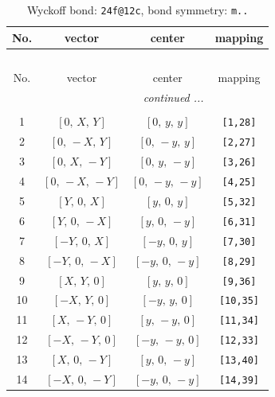 \documentclass[fleqn,8pt]{jsarticle}
\begin{document}
\begin{longtable}{cccc}
\caption{Wyckoff bond: {\tt 24f@12c}, bond symmetry: {\tt m..}}
 \\
 \hline \hline
No. & vector & center & mapping \\ \hline \endfirsthead

\multicolumn{3}{l}{\tablename\ \thetable{}} \\
 \hline \hline
No. & vector & center & mapping \\ \hline \endhead

 \hline \hline
\multicolumn{3}{r}{\footnotesize\it continued ...} \\ \endfoot

 \hline \hline
\multicolumn{3}{r}{} \\ \endlastfoot

1 & $\left[ 0,\, X,\, Y \right]$ & $\left[ 0,\, y,\, y \right]$ & {\tt [1,28]} \\ \hline
2 & $\left[ 0,\, - X,\, Y \right]$ & $\left[ 0,\, - y,\, y \right]$ & {\tt [2,27]} \\ \hline
3 & $\left[ 0,\, X,\, - Y \right]$ & $\left[ 0,\, y,\, - y \right]$ & {\tt [3,26]} \\ \hline
4 & $\left[ 0,\, - X,\, - Y \right]$ & $\left[ 0,\, - y,\, - y \right]$ & {\tt [4,25]} \\ \hline
5 & $\left[ Y,\, 0,\, X \right]$ & $\left[ y,\, 0,\, y \right]$ & {\tt [5,32]} \\ \hline
6 & $\left[ Y,\, 0,\, - X \right]$ & $\left[ y,\, 0,\, - y \right]$ & {\tt [6,31]} \\ \hline
7 & $\left[ - Y,\, 0,\, X \right]$ & $\left[ - y,\, 0,\, y \right]$ & {\tt [7,30]} \\ \hline
8 & $\left[ - Y,\, 0,\, - X \right]$ & $\left[ - y,\, 0,\, - y \right]$ & {\tt [8,29]} \\ \hline
9 & $\left[ X,\, Y,\, 0 \right]$ & $\left[ y,\, y,\, 0 \right]$ & {\tt [9,36]} \\ \hline
10 & $\left[ - X,\, Y,\, 0 \right]$ & $\left[ - y,\, y,\, 0 \right]$ & {\tt [10,35]} \\ \hline
11 & $\left[ X,\, - Y,\, 0 \right]$ & $\left[ y,\, - y,\, 0 \right]$ & {\tt [11,34]} \\ \hline
12 & $\left[ - X,\, - Y,\, 0 \right]$ & $\left[ - y,\, - y,\, 0 \right]$ & {\tt [12,33]} \\ \hline
13 & $\left[ X,\, 0,\, - Y \right]$ & $\left[ y,\, 0,\, - y \right]$ & {\tt [13,40]} \\ \hline
14 & $\left[ - X,\, 0,\, - Y \right]$ & $\left[ - y,\, 0,\, - y \right]$ & {\tt [14,39]} \\ \hline

\end{longtable}
\end{document}

